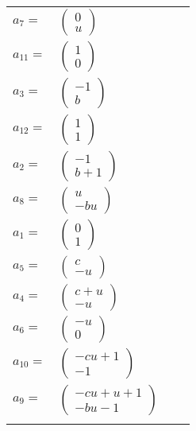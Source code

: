 \documentclass[1p]{elsarticle_modified}
\theoremstyle{definition}
\begin{document}
\begin{tabular}{m{7pt} m{180pt} m{7pt} m{180pt} }
\flushright $a_{7}=$&$\begin{pmatrix}0\\u\end{pmatrix}$ \\
\flushright $a_{11}=$&$\begin{pmatrix}1\\0\end{pmatrix}$ \\
\flushright $a_{3}=$&$\begin{pmatrix}-1\\b\end{pmatrix}$ \\
\flushright $a_{12}=$&$\begin{pmatrix}1\\1\end{pmatrix}$ \\
\flushright $a_{2}=$&$\begin{pmatrix}-1\\b+1\end{pmatrix}$ \\
\flushright $a_{8}=$&$\begin{pmatrix}u\\- b u\end{pmatrix}$ \\
\flushright $a_{1}=$&$\begin{pmatrix}0\\1\end{pmatrix}$ \\
\flushright $a_{5}=$&$\begin{pmatrix}c\\- u\end{pmatrix}$ \\
\flushright $a_{4}=$&$\begin{pmatrix}c+u\\- u\end{pmatrix}$ \\
\flushright $a_{6}=$&$\begin{pmatrix}- u\\0\end{pmatrix}$ \\
\flushright $a_{10}=$&$\begin{pmatrix}- c u+1\\-1\end{pmatrix}$ \\
\flushright $a_{9}=$&$\begin{pmatrix}- c u+u+1\\- b u-1\end{pmatrix}$\\&\end{tabular}
\end{document}
